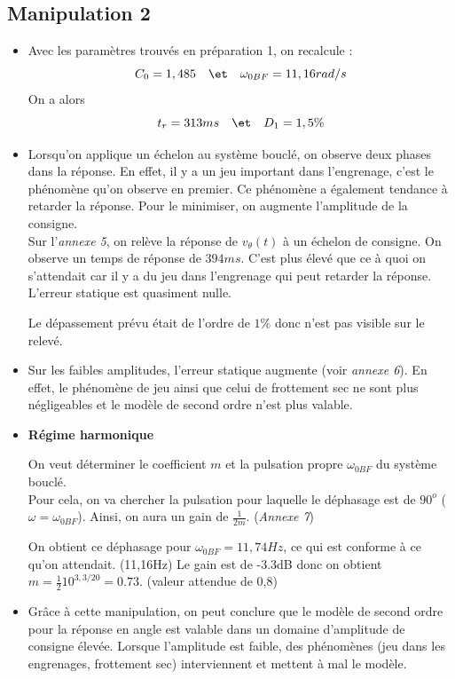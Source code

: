 \documentclass[../../Cours_M1.tex]{subfiles}
\begin{document}
\subsection*{Manipulation 2}

\begin{itemize}\setlength{\itemsep}{10mm}
\item Avec les paramètres trouvés en préparation 1, on recalcule :
\[ C_0 = 1,485 \quad \et \quad \omega_{0BF} = 11,16 rad/s \]
On a alors
\[ t_r = 313 ms \quad \et \quad D_1 = 1,5\% \]

\item Lorsqu'on applique un échelon au système bouclé, on observe deux phases dans la réponse. En effet, il y a un jeu important dans l'engrenage, c'est le phénomène qu'on observe en premier. Ce phénomène a également tendance à retarder la réponse. Pour le minimiser, on augmente l'amplitude de la consigne.\\

Sur l'\emph{annexe 5}, on relève la réponse de $v_{\theta}(t)$ à un échelon de consigne. On observe un temps de réponse de $394ms$. C'est plus élevé que ce à quoi on s'attendait car il y a du jeu dans l'engrenage qui peut retarder la réponse. L'erreur statique est quasiment nulle.

Le dépassement prévu était de l'ordre de $1\%$ donc n'est pas visible sur le relevé.

\item Sur les faibles amplitudes, l'erreur statique augmente (voir \emph{annexe 6}). En effet, le phénomène de jeu ainsi que celui de frottement sec ne sont plus négligeables et le modèle de second ordre n'est plus valable.


\item \textbf{Régime harmonique}

On veut déterminer le coefficient $m$ et la pulsation propre $\omega_{0BF}$ du système bouclé.\\

Pour cela, on va chercher la pulsation pour laquelle le déphasage est de $90^o$ ($\omega=\omega_{0BF}$). Ainsi, on aura un gain de $\frac{1}{2m}$. (\emph{Annexe 7})

On obtient ce déphasage pour $\omega_{0BF}=11,74Hz$, ce qui est conforme à ce qu'on attendait. (11,16Hz)
Le gain est de -3.3dB donc on obtient $m=\frac{1}{2}10^{3,3/20}=0.73$. (valeur attendue de 0,8)

\item Grâce à cette manipulation, on peut conclure que le modèle de second ordre pour la réponse en angle est valable dans un domaine d'amplitude de consigne élevée. Lorsque l'amplitude est faible, des phénomènes (jeu dans les engrenages, frottement sec) interviennent et mettent à mal le modèle.
\end{itemize}
\end{document}
